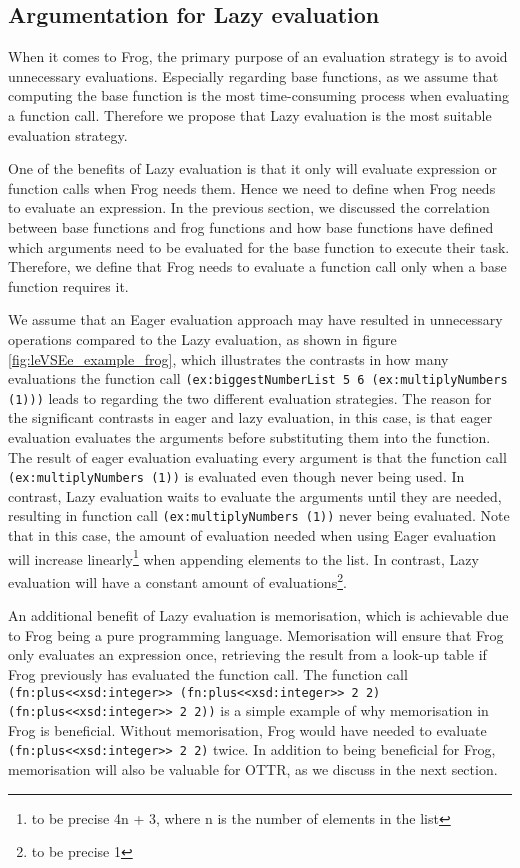 \subsection{Argumentation for Lazy evaluation}
When it comes to Frog, the primary purpose of an evaluation strategy is to avoid unnecessary evaluations. Especially regarding base functions, as we assume that computing the base function is the most time-consuming process when evaluating a function call. Therefore we propose that Lazy evaluation is the most suitable evaluation strategy. 

\para
One of the benefits of Lazy evaluation is that it only will evaluate expression or function calls when Frog needs them. Hence we need to define when Frog needs to evaluate an expression. In the previous section, we discussed the correlation between base functions and frog functions and how base functions have defined which arguments need to be evaluated for the base function to execute their task. Therefore, we define that Frog needs to evaluate a function call only when a base function requires it.

\para
We assume that an Eager evaluation approach may have resulted in unnecessary operations compared to the Lazy evaluation, as shown in figure \ref{fig:leVSEe_example_frog}, which illustrates the contrasts in how many evaluations the function call \lstinline{(ex:biggestNumberList 5 6 (ex:multiplyNumbers (1)))} leads to regarding the two different evaluation strategies. The reason for the significant contrasts in eager and lazy evaluation, in this case, is that eager evaluation evaluates the arguments before substituting them into the function. The result of eager evaluation evaluating every argument is that the function call \lstinline{(ex:multiplyNumbers (1))} is evaluated even though never being used. In contrast, Lazy evaluation waits to evaluate the arguments until they are needed, resulting in function call \lstinline{(ex:multiplyNumbers (1))} never being evaluated. Note that in this case, the amount of evaluation needed when using Eager evaluation will increase linearly\footnote{to be precise 4n + 3, where n is the number of elements in the list} when appending elements to the list. In contrast, Lazy evaluation will have a constant amount of evaluations\footnote{to be precise 1}.

\para
An additional benefit of Lazy evaluation is memorisation, which is achievable due to Frog being a pure programming language. Memorisation will ensure that Frog only evaluates an expression once, retrieving the result from a look-up table if Frog previously has evaluated the function call. The function call \lstinline{(fn:plus<<xsd:integer>> (fn:plus<<xsd:integer>> 2 2) (fn:plus<<xsd:integer>> 2 2))} is a simple example of why memorisation in Frog is beneficial. Without memorisation, Frog would have needed to evaluate \lstinline{(fn:plus<<xsd:integer>> 2 2)} twice. In addition to being beneficial for Frog, memorisation will also be valuable for OTTR, as we discuss in the next section. 

